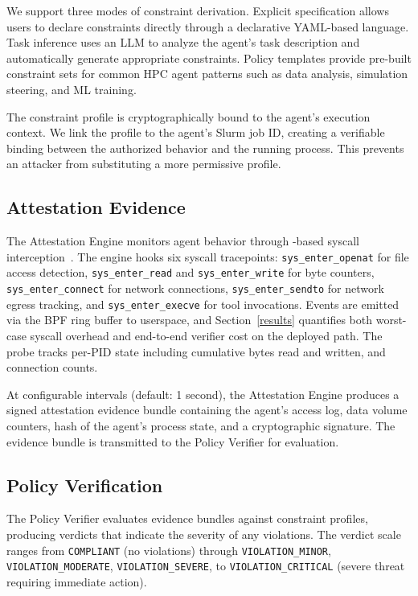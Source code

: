 We support three modes of constraint derivation. Explicit specification allows users to declare constraints directly through a declarative YAML-based language. Task inference uses an LLM to analyze the agent's task description and automatically generate appropriate constraints. Policy templates provide pre-built constraint sets for common HPC agent patterns such as data analysis, simulation steering, and ML training.

The constraint profile is cryptographically bound to the agent's execution context. We link the profile to the agent's Slurm job ID, creating a verifiable binding between the authorized behavior and the running process. This prevents an attacker from substituting a more permissive profile.

\subsection{Attestation Evidence}

The Attestation Engine monitors agent behavior through \ebpf-based syscall interception~\cite{gregg2020bpf}. The engine hooks six syscall tracepoints: \texttt{sys\_enter\_openat} for file access detection, \texttt{sys\_enter\_read} and \texttt{sys\_enter\_write} for byte counters, \texttt{sys\_enter\_connect} for network connections, \texttt{sys\_enter\_sendto} for network egress tracking, and \texttt{sys\_enter\_execve} for tool invocations. Events are emitted via the BPF ring buffer to userspace, and Section~\ref{results} quantifies both worst-case syscall overhead and end-to-end verifier cost on the deployed path. The probe tracks per-PID state including cumulative bytes read and written, and connection counts.

At configurable intervals (default: 1 second), the Attestation Engine produces a signed attestation evidence bundle containing the agent's access log, data volume counters, hash of the agent's process state, and a cryptographic signature. The evidence bundle is transmitted to the Policy Verifier for evaluation.

\subsection{Policy Verification}

The Policy Verifier evaluates evidence bundles against constraint profiles, producing verdicts that indicate the severity of any violations. The verdict scale ranges from \texttt{COMPLIANT} (no violations) through \texttt{VIOLATION\_MINOR}, \texttt{VIOLATION\_MODERATE}, \texttt{VIOLATION\_SEVERE}, to \texttt{VIOLATION\_CRITICAL} (severe threat requiring immediate action).

